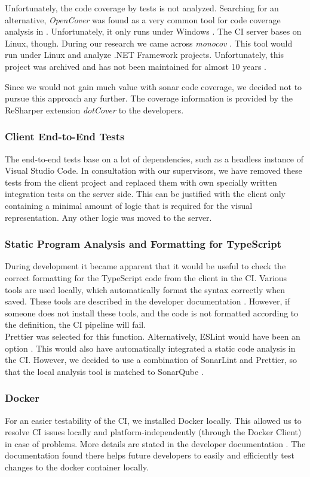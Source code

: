 Unfortunately, the code coverage by tests is not analyzed.
Searching for an alternative, \textit{OpenCover} was found as a very common tool for code coverage analysis in \Csharp.
Unfortunately, it only runs under Windows  \cite{opencover}.
The CI server bases on Linux, though.
During our research we came across \textit{monocov} \cite{monocov}.
This tool would run under Linux and analyze .NET Framework projects.
Unfortunately, this project was archived and has not been maintained for almost 10 years \cite{monocov}.

Since we would not gain much value with sonar code coverage, we decided not to pursue this approach any further.
The coverage information is provided by the ReSharper extension \textit{dotCover} \cite{dotcover} to the developers.

\subsubsection{Client End-to-End Tests}
The end-to-end tests base on a lot of dependencies, such as a headless instance of Visual Studio Code.
In consultation with our supervisors, we have removed these tests from the client project and replaced them with own specially written integration tests on the server side.
This can be justified with the client only containing a minimal amount of logic that is required for the visual representation.
Any other logic was moved to the server.

\subsubsection{Static Program Analysis and Formatting for TypeScript}
During development it became apparent that it would be useful to check the correct formatting
for the TypeScript code from the client in the CI.
Various tools are used locally, which automatically format the syntax correctly when saved.
These tools are described in the developer documentation \cite{dev}.
However, if someone does not install these tools,
and the code is not formatted according to the definition,
the CI pipeline will fail. \\

Prettier was selected for this function.
Alternatively, ESLint would have been an option \cite{eslint}.
This would also have automatically integrated a static code analysis in the CI.
However, we decided to use a combination of SonarLint and Prettier,
so that the local analysis tool is matched to SonarQube \cite{dev}.

\subsubsection{Docker}
For an easier testability of the CI, we installed Docker locally.
This allowed us to resolve CI issues locally and platform-independently (through the Docker Client) in case of problems.
More details are stated in the developer documentation \cite{dev}.
The documentation found there helps future developers to easily and efficiently test changes to the docker container locally. \\
